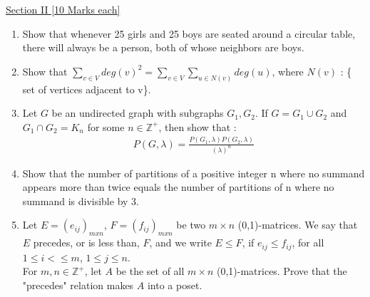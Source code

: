 \documentclass{article}
\begin{document}
\underline{\large{Section II \hspace*{10cm} [10 Marks each]}}
\begin{enumerate} 
 \item Show that whenever 25 girls and 25 boys are seated around a circular table, there will always be a person, both of whose neighbors are boys.
 
 \item Show that $\sum_{v \in V} deg(v)^2 = \sum_{v \in V}\sum_{u \in N(v)}deg(u)$, where $N(v)$ : \{ set of vertices adjacent to v\}.
 
  
 \item Let $G$ be an undirected graph with subgraphs $G_1,G_2$. If $G=G_1 \cup G_2$ and $G_1 \cap G_2 = K_n$ for some $n \in \mathbb{Z}^+$, then show that :
 \begin{align*}
 P(G,\lambda) = \frac{P(G_1,\lambda)P(G_2,\lambda)}{(\lambda)^n}
 \end{align*}
 
 
 
 \item Show that the number of partitions of a positive integer n
where no summand appears more than twice equals the number
of partitions of n where no summand is divisible by 3.
 
 \item Let $E = (e_{ij})_{mxn}$, $F = (f_{ij})_{mxn}$ be two $m\times n $ (0,1)-matrices. We say that $E$ precedes, or
is less than, $F$, and we write $E \leq F$, if $e_{ij} \leq f_{ij}$, for all $1 \leq i <\leq m$, $1 \leq j \leq n$.\\
For $m,n\in \mathbb{Z}^+$, let $A$ be the set of all $m\times n$ (0,1)-matrices. Prove that the "precedes" relation makes $A$ into a poset.


 
 

  
 
 \end{enumerate}
\end{document}
